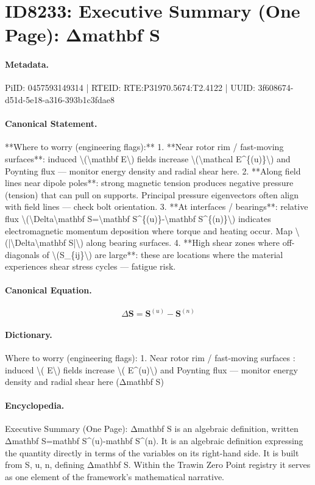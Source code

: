 \section*{ID8233: Executive Summary (One Page): Δmathbf S}
\paragraph{Metadata.}
PiID: 0457593149314 | RTEID: RTE:P31970.5674:T2.4122 | UUID: 3f608674-d51d-5e18-a316-393b1c3fdae8

\paragraph{Canonical Statement.}
**Where to worry (engineering flags):** 1. **Near rotor rim / fast-moving surfaces**: induced \textbackslash{}(\textbackslash{}mathbf E\textbackslash{}) fields increase \textbackslash{}(\textbackslash{}mathcal E\textasciicircum{}\{(u)\}\textbackslash{}) and Poynting flux — monitor energy density and radial shear here. 2. **Along field lines near dipole poles**: strong magnetic tension produces negative pressure (tension) that can pull on supports. Principal pressure eigenvectors often align with field lines — check bolt orientation. 3. **At interfaces / bearings**: relative flux \textbackslash{}(\textbackslash{}Delta\textbackslash{}mathbf S=\textbackslash{}mathbf S\textasciicircum{}\{(u)\}-\textbackslash{}mathbf S\textasciicircum{}\{(n)\}\textbackslash{}) indicates electromagnetic momentum deposition where torque and heating occur. Map \textbackslash{}(|\textbackslash{}Delta\textbackslash{}mathbf S|\textbackslash{}) along bearing surfaces. 4. **High shear zones where off-diagonals of \textbackslash{}(S\_\{ij\}\textbackslash{}) are large**: these are locations where the material experiences shear stress cycles — fatigue risk.

\paragraph{Canonical Equation.}
\[
\Delta\mathbf S=\mathbf S^{(u)}-\mathbf S^{(n)}
\]

\paragraph{Dictionary.}
Where to worry (engineering flags): 1. Near rotor rim / fast-moving surfaces : induced \textbackslash{}( E\textbackslash{}) fields increase \textbackslash{}( E\textasciicircum{}(u)\textbackslash{}) and Poynting flux — monitor energy density and radial shear here (Δmathbf S)

\paragraph{Encyclopedia.}
Executive Summary (One Page): Δmathbf S is an algebraic definition, written Δmathbf S=mathbf S\textasciicircum{}(u)-mathbf S\textasciicircum{}(n). It is an algebraic definition expressing the quantity directly in terms of the variables on its right-hand side. It is built from S, u, n, defining Δmathbf S. Within the Trawin Zero Point registry it serves as one element of the framework's mathematical narrative.
